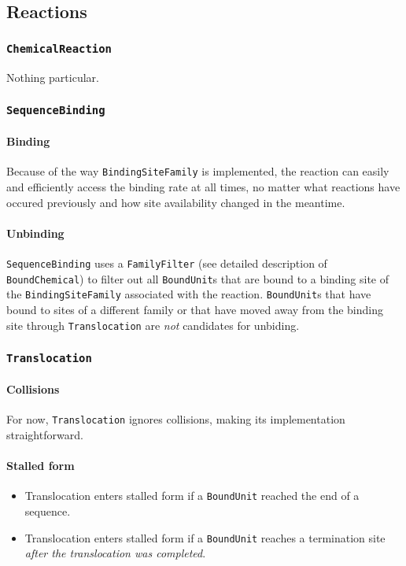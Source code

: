 
\subsection{Reactions}

\subsubsection{\texttt{ChemicalReaction}}

Nothing particular.

\subsubsection{\texttt{SequenceBinding}}

\paragraph{Binding} Because of the way \texttt{BindingSiteFamily} is implemented, the reaction can easily and efficiently access the binding rate at all times, no matter what reactions have occured previously and how site availability changed in the meantime.

\paragraph{Unbinding} \texttt{SequenceBinding} uses a \texttt{FamilyFilter} (see detailed description of \texttt{BoundChemical}) to filter out all \texttt{BoundUnit}s that are bound to a binding site of the \texttt{BindingSiteFamily} associated with the reaction. \texttt{BoundUnit}s that have bound to sites of a different family or that have moved away from the binding site through \texttt{Translocation} are \emph{not} candidates for unbiding.

\subsubsection{\texttt{Translocation}}

\paragraph{Collisions} For now, \texttt{Translocation} ignores collisions, making its implementation straightforward.

\paragraph{Stalled form}
\begin{itemize}
  \item Translocation enters stalled form if a \texttt{BoundUnit} reached the end of a sequence.
  \item Translocation enters stalled form if a \texttt{BoundUnit} reaches a termination site \emph{after the translocation was completed}. 
\end{itemize}

